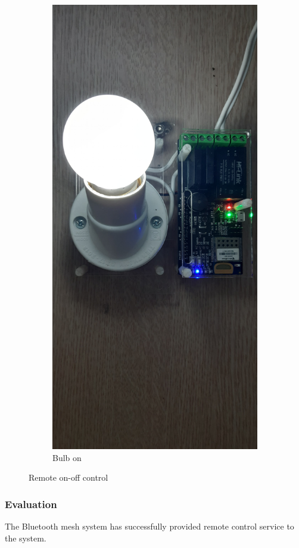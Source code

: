 \documentclass[\main/main.tex]{subfiles}
\begin{document}
\begin{figure}[H]
\begin{subfigure}[b]{0.4\linewidth}
    \end{subfigure}
    \begin{subfigure}[b]{0.4\linewidth}
        \centering
        \includegraphics[angle = 90, width=0.9\linewidth]{result_remote_control_on_result.jpg}
        \caption{Bulb on}
        \label{fig:result_remote_control_on_result}
    \end{subfigure}
    \caption{Remote on-off control}
    \label{fig:result_remote_control}
\end{figure}


\subsubsection{Evaluation}
The Bluetooth mesh system has successfully provided remote control service to the system.
\end{document}
